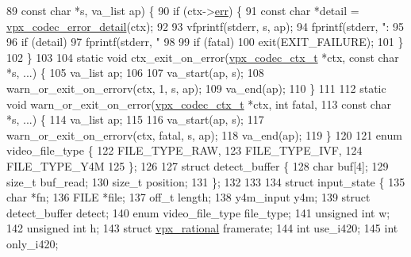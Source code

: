 \begin{DoxyCodeInclude}
89                                    \textcolor{keyword}{const} \textcolor{keywordtype}{char} *s, va\_list ap) \{
90   \textcolor{keywordflow}{if} (ctx->\hyperlink{structvpx__codec__ctx_a6f448802b0675013fd8c5179675c30de}{err}) \{
91     \textcolor{keyword}{const} \textcolor{keywordtype}{char} *detail = \hyperlink{group__codec_ga29273cb552ed1a437fe263c4a0a54300}{vpx\_codec\_error\_detail}(ctx);
92 
93     vfprintf(stderr, s, ap);
94     fprintf(stderr, \textcolor{stringliteral}{": %
95 
96     \textcolor{keywordflow}{if} (detail)
97       fprintf(stderr, \textcolor{stringliteral}{"    %
98 
99     \textcolor{keywordflow}{if} (fatal)
100       exit(EXIT\_FAILURE);
101   \}
102 \}
103 
104 \textcolor{keyword}{static} \textcolor{keywordtype}{void} ctx\_exit\_on\_error(\hyperlink{structvpx__codec__ctx}{vpx\_codec\_ctx\_t} *ctx, \textcolor{keyword}{const} \textcolor{keywordtype}{char} *s, ...) \{
105   va\_list ap;
106 
107   va\_start(ap, s);
108   warn\_or\_exit\_on\_errorv(ctx, 1, s, ap);
109   va\_end(ap);
110 \}
111 
112 \textcolor{keyword}{static} \textcolor{keywordtype}{void} warn\_or\_exit\_on\_error(\hyperlink{structvpx__codec__ctx}{vpx\_codec\_ctx\_t} *ctx, \textcolor{keywordtype}{int} fatal,
113                                   \textcolor{keyword}{const} \textcolor{keywordtype}{char} *s, ...) \{
114   va\_list ap;
115 
116   va\_start(ap, s);
117   warn\_or\_exit\_on\_errorv(ctx, fatal, s, ap);
118   va\_end(ap);
119 \}
120 
121 \textcolor{keyword}{enum} video\_file\_type \{
122   FILE\_TYPE\_RAW,
123   FILE\_TYPE\_IVF,
124   FILE\_TYPE\_Y4M
125 \};
126 
127 \textcolor{keyword}{struct }detect\_buffer \{
128   \textcolor{keywordtype}{char} buf[4];
129   \textcolor{keywordtype}{size\_t} buf\_read;
130   \textcolor{keywordtype}{size\_t} position;
131 \};
132 
133 
134 \textcolor{keyword}{struct }input\_state \{
135   \textcolor{keywordtype}{char}                 *fn;
136   FILE                 *file;
137   off\_t                 length;
138   y4m\_input             y4m;
139   \textcolor{keyword}{struct }detect\_buffer  detect;
140   \textcolor{keyword}{enum} video\_file\_type  file\_type;
141   \textcolor{keywordtype}{unsigned} \textcolor{keywordtype}{int}          w;
142   \textcolor{keywordtype}{unsigned} \textcolor{keywordtype}{int}          h;
143   \textcolor{keyword}{struct }\hyperlink{structvpx__rational}{vpx\_rational}   framerate;
144   \textcolor{keywordtype}{int}                   use\_i420;
145   \textcolor{keywordtype}{int}                   only\_i420;
}}
\end{DoxyCodeInclude}
